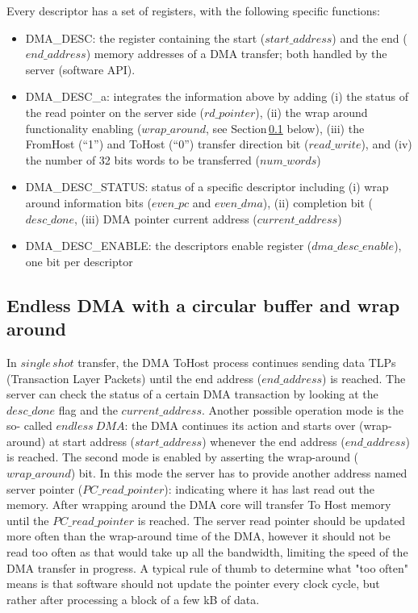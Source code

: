 Every descriptor has a set of registers, with the following specific functions:
\begin{itemize}\itemsep-4pt
\item DMA\_DESC: the register containing the start ($start\_address$) and the end ($end\_address$) memory addresses of a DMA transfer; both handled by the server (software API).
\item DMA\_DESC\_a: integrates the information above by adding (i) the status of the read pointer on the server side ($rd\_pointer$), (ii) the wrap around functionality enabling ($wrap\_around$, see Section\,\ref{sec:endless_dma} below), (iii) the FromHost (``1'') and ToHost (``0'') transfer direction bit ($read\_write$), and (iv) the number of 32 bits words to be transferred ($num\_words$)
	\item DMA\_DESC\_STATUS: status of a specific descriptor including (i) wrap around information bits ($even\_pc$ and $even\_dma$), (ii) completion bit ($desc\_done$, (iii) DMA pointer current address ($current\_address$)
	\item DMA\_DESC\_ENABLE: the descriptors enable register ($dma\_desc\_enable$), one bit per descriptor 
\end{itemize}

\subsection{Endless DMA with a circular buffer and wrap around}
\label{sec:endless_dma}

In $single\,shot$ transfer, the DMA ToHost process continues sending data TLPs (Transaction Layer Packets) until the end address ($end\_address$) is reached.
The server can check the status of a certain DMA transaction by looking at the $desc\_done$ flag and the $current\_address$. Another possible operation mode is the so- called $endless\ DMA$: the DMA continues its action and starts over (wrap-around) at start address ($start\_address$) whenever the end address ($end\_address$) is reached. The second mode is enabled by asserting the wrap-around ($wrap\_around$) bit. In this mode the server has to provide another address named server pointer ($PC\_read\_pointer$): indicating where it has last read out the memory. After wrapping around the DMA core will transfer To Host memory until the $PC\_read\_pointer$ is reached. The server read pointer should be updated more often than the wrap-around time of the DMA, however it should not be read too often as that would take up all the bandwidth, limiting the speed of the DMA transfer in progress. A typical rule of thumb to determine what "too often" means is that software should not update the pointer every clock cycle, but rather after processing a block of a few kB of data.

